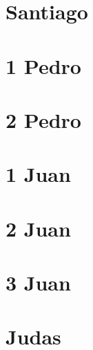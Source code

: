 \chapter{Santiago}
\begin{multicols}{2}
  \raggedcolumns
  \parskip=0pt \relax
  
\end{multicols}

\chapter{1 Pedro}
\begin{multicols}{2}
  \raggedcolumns
  \parskip=0pt \relax
  
\end{multicols}

\chapter{2 Pedro}
\begin{multicols}{2}
  \raggedcolumns
  \parskip=0pt \relax
  
\end{multicols}

\chapter{1 Juan}
\begin{multicols}{2}
  \raggedcolumns
  \parskip=0pt \relax
  
\end{multicols}

\chapter{2 Juan}
\begin{multicols}{2}
  \raggedcolumns
  \parskip=0pt \relax
  
\end{multicols}

\chapter{3 Juan}
\begin{multicols}{2}
  \raggedcolumns
  \parskip=0pt \relax
  
\end{multicols}

\chapter{Judas}
\begin{multicols}{2}
  \raggedcolumns
  \parskip=0pt \relax
  
\end{multicols}

